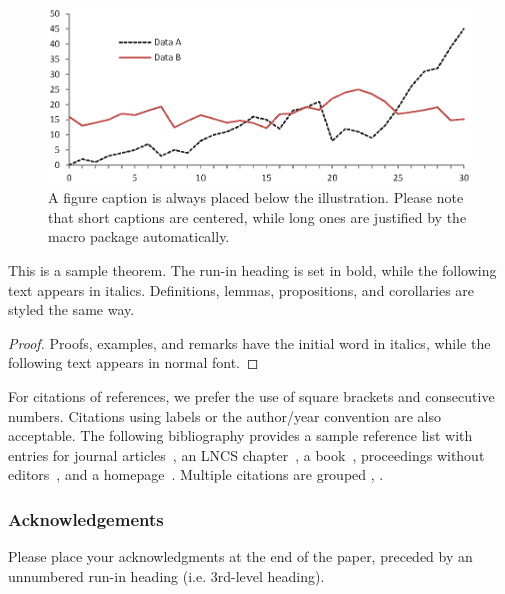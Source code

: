 \documentclass[runningheads]{llncs}
\begin{document}
\begin{figure}
\includegraphics[width=\textwidth]{fig1.eps}
\caption{A figure caption is always placed below the illustration.
Please note that short captions are centered, while long ones are
justified by the macro package automatically.} \label{fig1}
\end{figure}

\begin{theorem}
This is a sample theorem. The run-in heading is set in bold, while
the following text appears in italics. Definitions, lemmas,
propositions, and corollaries are styled the same way.
\end{theorem}
%
%
\begin{proof}
Proofs, examples, and remarks have the initial word in italics,
while the following text appears in normal font.
\end{proof}
For citations of references, we prefer the use of square brackets
and consecutive numbers. Citations using labels or the author/year
convention are also acceptable. The following bibliography provides
a sample reference list with entries for journal
articles~\cite{ref_article1}, an LNCS chapter~\cite{ref_lncs1}, a
book~\cite{ref_book1}, proceedings without editors~\cite{ref_proc1},
and a homepage~\cite{ref_url1}. Multiple citations are grouped
\cite{ref_article1,ref_lncs1,ref_book1},
\cite{ref_article1,ref_book1,ref_proc1,ref_url1}.

\subsubsection{Acknowledgements} Please place your acknowledgments at
the end of the paper, preceded by an unnumbered run-in heading (i.e.
3rd-level heading).
\end{document}
